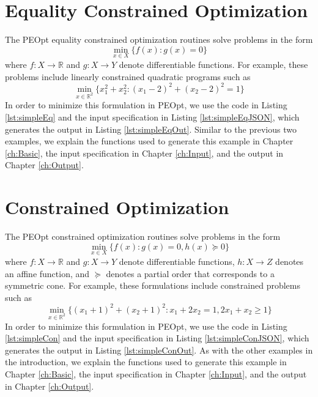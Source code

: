 \documentclass{report}
\newcommand{\re}{\mathbb{R}}
\begin{document}




\section{Equality Constrained Optimization}

        The PEOpt equality constrained optimization routines solve problems in the form
$$
        \min_{x\in X} \{ f(x) : g(x)=0 \}
$$
where $f:X\rightarrow \re$ and $g:X\rightarrow Y$ denote differentiable functions.  For example, these problems include linearly constrained quadratic programs such as
$$
        \min_{x\in\re^2}\{x_1^2+x_2^2 : (x_1-2)^2 + (x_2-2)^2 = 1 \}
$$
In order to minimize this formulation in PEOpt, we use the code in Listing \ref{lst:simpleEq} and the input specification in Listing \ref{lst:simpleEqJSON}, which generates the output in Listing \ref{lst:simpleEqOut}.  Similar to the previous two examples, we explain the functions used to generate this example in Chapter \ref{ch:Basic}, the input specification in Chapter \ref{ch:Input}, and the output in Chapter \ref{ch:Output}.





\section{Constrained Optimization}

        The PEOpt constrained optimization routines solve problems in the form
$$
        \min_{x\in X} \{ f(x) : g(x)=0, h(x)\succeq 0 \}
$$
where $f:X\rightarrow \re$ and $g:X\rightarrow Y$ denote differentiable functions, $h:X\rightarrow Z$ denotes an affine function, and $\succeq$ denotes a partial order that corresponds to a symmetric cone.  For example, these formulations include constrained problems such as 
$$
        \min_{x\in\re^2}\{(x_1+1)^2+(x_2+1)^2 :  x_1 + 2x_2 = 1, 2x_1 + x_2 \geq 1 \} 
$$
In order to minimize this formulation in PEOpt, we use the code in Listing \ref{lst:simpleCon} and the input specification in Listing \ref{lst:simpleConJSON}, which generates the output in Listing \ref{lst:simpleConOut}.  As with the other examples in the introduction, we explain the functions used to generate this example in Chapter \ref{ch:Basic}, the input specification in Chapter \ref{ch:Input}, and the output in Chapter \ref{ch:Output}.




\end{document}

